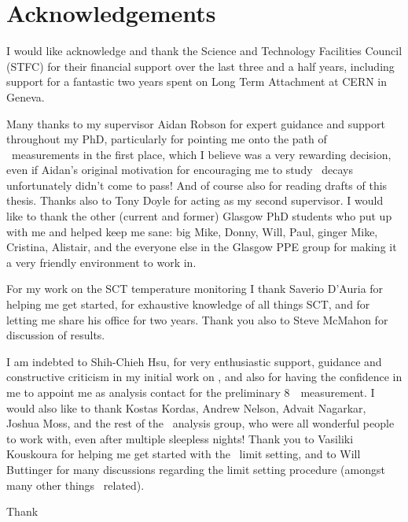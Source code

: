 \chapter*{Acknowledgements}
I would like acknowledge and thank the Science and Technology Facilities Council
(STFC) for their financial support over the last three and a half years,
including support for a fantastic two years spent on Long Term Attachment at CERN
in Geneva.

Many thanks to my supervisor Aidan Robson for expert guidance and support throughout my
PhD, particularly for pointing me onto the path of \ZZ\ measurements in the first
place, which I believe was a very rewarding decision, even if Aidan's original
motivation for encouraging me to study \ZZ\ decays unfortunately didn't come to
pass! And of course also for reading drafts of this thesis. Thanks also to Tony
Doyle for acting as my second supervisor.
I would like to thank the other (current and former) Glasgow PhD students who put up with me and
helped keep me sane: big Mike, Donny, Will, Paul, ginger Mike, Cristina,
Alistair, and the everyone else in the Glasgow PPE group for making it a very
friendly environment to work in.

For my work on the SCT temperature monitoring I thank Saverio D'Auria
for helping me get started, for exhaustive knowledge of all things SCT, and for
letting me share his office for two years. Thank you also to Steve McMahon for
discussion of results.

I am indebted to Shih-Chieh Hsu, for very enthusiastic
support, guidance and constructive criticism in my initial work on \ZZ, and
also for having the confidence in me to appoint me as analysis contact for the
preliminary 8~\tev\ measurement. I would also like to thank Kostas Kordas,
Andrew Nelson, Advait Nagarkar, Joshua Moss, and the rest of the \ZZ\ analysis
group, who were all wonderful people to work with, even after multiple sleepless
nights! Thank you to Vasiliki Kouskoura for helping me get started with the
\TGC\ limit setting, and to Will Buttinger for many discussions regarding the
limit setting procedure (amongst many other things \ZZ\ related).

Thank
